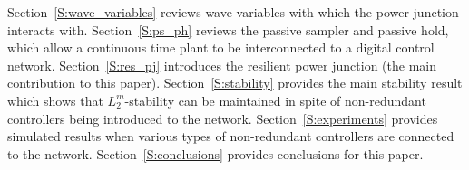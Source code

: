 Section~\ref{S:wave_variables} reviews wave 
variables with which the power junction interacts with.
Section~\ref{S:ps_ph} reviews the passive sampler and passive hold,
which allow a continuous time plant to be interconnected to a
digital control network.  Section~\ref{S:res_pj} introduces the
resilient power junction (the main contribution to this paper).
Section~\ref{S:stability} provides the main stability result which
shows that $L^m_2$-stability can be maintained in spite of
non-redundant controllers being introduced to the network.
Section~\ref{S:experiments} provides simulated results when various types
of non-redundant controllers are connected to the network.
Section~\ref{S:conclusions} provides conclusions for this paper.